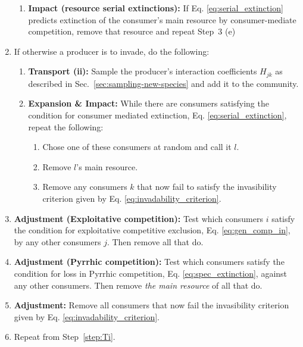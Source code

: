 \documentclass[a4paper]{report}
\begin{document}
\begin{enumerate}
\begin{enumerate}
\item \textbf{Impact (resource serial extinctions):} If
    Eq. \eqref{eq:serial_extinction} predicts extinction of the
    consumer's main resource by consumer-mediate competition,
    remove that resource and repeat
    Step~3 (e) \label{step:serial_extinction}
  \end{enumerate}
\item If otherwise a producer is to invade, do the following:
  \begin{enumerate}
\item \textbf{Transport (ii):} Sample the producer's interaction
    coefficients $H_{jk}$ as described in
    Sec.~\ref{sec:sampling-new-species} and add it to the
    community\label{step:TiiP}.
\item \textbf{Expansion \& Impact:} While there are consumers
    satisfying the condition for consumer mediated extinction,
    Eq. \eqref{eq:serial_extinction}, repeat the following:
    \begin{enumerate}
    \item Chose one of these consumers at random and call it $l$.
\item Remove $l$'s main resource.
\item Remove any consumers $k$ that now fail
      to satisfy the invasibility
      criterion given by Eq. \eqref{eq:invadability_criterion}.
    \end{enumerate}
  \end{enumerate}
\item \label{step:adjustment_start}\textbf{Adjustment (Exploitative
    competition):} Test which consumers $i$ satisfy the condition for
  exploitative competitive exclusion, Eq. \eqref{eq:gen_comp_in}, by
  any other consumers $j$.  Then remove all that do.
\item \textbf{Adjustment (Pyrrhic competition):} Test which consumers
  satisfy the condition for loss in Pyrrhic competition,
  Eq. \eqref{eq:spec_extinction}, against any other consumers.  Then
  remove \emph{the main resource} of all that do.
\item \textbf{Adjustment:} Remove
  all consumers that now fail the invasibility criterion given by
  Eq. \eqref{eq:invadability_criterion}.
\item Repeat from Step~\ref{step:Ti}.
\end{enumerate}

\newpage
\end{document}
